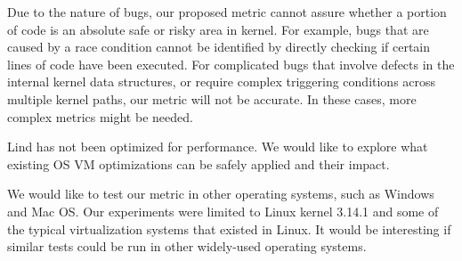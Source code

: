 Due to the nature of bugs, our proposed metric cannot assure whether a portion of code
is an absolute safe or risky area in kernel.
For example, bugs that are caused
by a race condition cannot be identified by directly checking if certain lines of
code have been executed. For complicated bugs that involve defects in the internal
kernel data structures, or require complex triggering conditions across multiple
kernel paths, our metric will not be accurate.
In these cases, more complex metrics might be needed.




Lind has not been optimized for performance.
We would like to explore what existing OS VM optimizations can be safely applied
and their impact.

We would like to test our metric in other operating systems, such as Windows and Mac OS.
Our experiments were limited to Linux kernel 3.14.1 and some of the typical virtualization systems that existed in Linux.
It would be interesting
if similar tests could be run in other widely-used operating systems.
